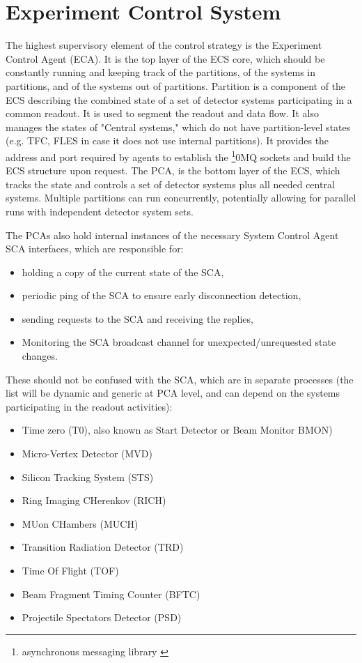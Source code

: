 \section{Experiment Control System}\label{sssAgents}

The highest supervisory element of the control strategy is the Experiment Control Agent 
(\gls{ECA}). It is the top layer of the \gls{ECS} core, which should be constantly running and keeping track of the  partitions, of the systems in partitions, and of the systems out of partitions. Partition is a component of the \gls{ECS} describing the combined state of a set of detector systems participating in a common readout. It is used to segment the readout and data flow. It also manages the states of "Central systems," which do not have partition-level states (e.g. \gls{TFC}, \gls{FLES} in case it does not use internal partitions).  It provides the address and port required by agents to establish the \footnote{asynchronous messaging library \cite{zeromq}}{0MQ} sockets and build the \gls{ECS} structure upon request. The \gls{PCA}, is the bottom layer of the \gls{ECS}, which tracks the state and controls a set of detector systems plus all needed central systems. Multiple partitions can run concurrently, potentially allowing for parallel runs with independent detector system sets. 

The \glspl{PCA} also hold internal instances of the necessary System Control Agent \gls{SCA} interfaces, which are responsible for:
\begin{itemize}
 \item holding a copy of the current state of the \gls{SCA},
 \item periodic ping of the \gls{SCA} to ensure early disconnection detection,
 \item sending requests to the \gls{SCA} and receiving the replies,
 \item Monitoring the \gls{SCA} broadcast channel for unexpected/unrequested state changes.
\end{itemize}
These should not be confused with the \gls{SCA}, which are in separate processes (the list will be dynamic and generic at \gls{PCA} level, and can depend on the systems participating in the readout activities):

\begin{itemize}
 \item Time zero (T0), also known as Start Detector or Beam Monitor \gls{BMON})
 \item Micro-Vertex Detector (\gls{MVD})
 \item Silicon Tracking System (\gls{STS})
 \item Ring Imaging CHerenkov (\gls{RICH})
 \item MUon CHambers (\gls{MUCH})
 \item Transition Radiation Detector (\gls{TRD})
 \item Time Of Flight (\gls{TOF})
 \item Beam Fragment Timing Counter (\gls{BFTC})
 \item Projectile Spectators Detector (\gls{PSD})
\end{itemize}

